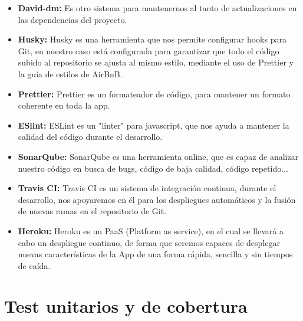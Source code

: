 \begin{itemize}
  \item \textbf{David-dm:} Es otro sistema para mantenernos al tanto de actualizaciones en las dependencias del proyecto.
  
  \item \textbf{Husky:} Husky es una herramienta que nos permite configurar \gls{hooks} para Git, en nuestro caso está configurada para garantizar que todo el código subido al repositorio se ajusta al mismo estilo, mediante el uso de Prettier y la guía de estilos de AirBnB.
  
  \item \textbf{Prettier:} Prettier es un formateador de código, para mantener un formato coherente en toda la app. 
  
  \item \textbf{ESlint:} ESLint es un "\gls{linter}" para javascript, que nos ayuda a mantener la calidad del código durante el desarrollo.
  
  \item \textbf{SonarQube:} SonarQube es una herramienta online, que es capaz de analizar nuestro código en busca de bugs, código de baja calidad, código repetido...
  
  \item \textbf{Travis CI:} Travis CI es un sistema de integración continua, durante el desarrollo, nos apoyaremos en él para los despliegues automáticos y la fusión de nuevas ramas en el repositorio de Git.
  
  \item \textbf{Heroku:} Heroku es un \gls{PaaS} (Platform as service), en el cual se llevará a cabo un despliegue continuo, de forma que seremos capaces de desplegar nuevas características de la App de una forma rápida, sencilla y sin tiempos de caída.

\end{itemize}
\section {Test unitarios y de cobertura}
